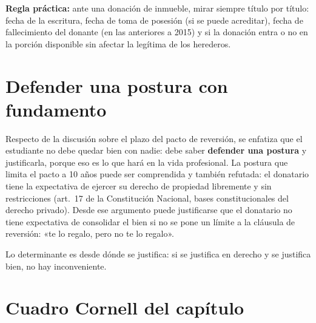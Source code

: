 \documentclass[12pt,oneside]{book}
\begin{document}
\begin{important}
\textbf{Regla práctica:} ante una donación de inmueble, mirar siempre título por título: fecha de la escritura, fecha de toma de posesión (si se puede acreditar), fecha de fallecimiento del donante (en las anteriores a 2015) y si la donación entra o no en la porción disponible sin afectar la legítima de los herederos.
\end{important}

\section{Defender una postura con fundamento}

Respecto de la discusión sobre el plazo del pacto de reversión, se enfatiza que el estudiante no debe quedar bien con nadie: debe saber \textbf{defender una postura} y justificarla, porque eso es lo que hará en la vida profesional. La postura que limita el pacto a 10 años puede ser comprendida y también refutada: el donatario tiene la expectativa de ejercer su derecho de propiedad libremente y sin restricciones (art.~17 de la Constitución Nacional, bases constitucionales del derecho privado). Desde ese argumento puede justificarse que el donatario no tiene expectativa de consolidar el bien si no se pone un límite a la cláusula de reversión: «te lo regalo, pero no te lo regalo».

Lo determinante es desde dónde se justifica: si se justifica en derecho y se justifica bien, no hay inconveniente.

\section{Cuadro Cornell del capítulo}
\end{document}
